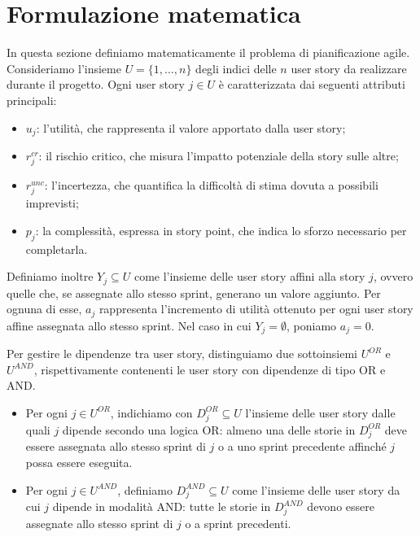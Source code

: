 \documentclass[12pt,a4paper,openright,twoside]{book}
\begin{document}
\chapter{Formulazione matematica}

In questa sezione definiamo matematicamente il problema di pianificazione agile. Consideriamo l'insieme \( U = \{1, \ldots, n\} \) degli indici delle \( n \) user story da realizzare durante il progetto. Ogni user story \( j \in U \) è caratterizzata dai seguenti attributi principali:
\begin{itemize}
    \item \( u_j \): l'utilità, che rappresenta il valore apportato dalla user story;
    \item \( r^{cr}_j \): il rischio critico, che misura l'impatto potenziale della story sulle altre;
    \item \( r^{unc}_j \): l'incertezza, che quantifica la difficoltà di stima dovuta a possibili imprevisti;
    \item \( p_j \): la complessità, espressa in story point, che indica lo sforzo necessario per completarla.
\end{itemize}

Definiamo inoltre \( Y_j \subseteq U \) come l'insieme delle user story affini alla story \( j \), ovvero quelle che, se assegnate allo stesso sprint, generano un valore aggiunto. Per ognuna di esse, \( a_j \) rappresenta l'incremento di utilità ottenuto per ogni user story affine assegnata allo stesso sprint. Nel caso in cui \( Y_j = \emptyset \), poniamo \( a_j = 0 \).

Per gestire le dipendenze tra user story, distinguiamo due sottoinsiemi \( U^{OR} \) e \( U^{AND} \), rispettivamente contenenti le user story con dipendenze di tipo OR e AND.
\begin{itemize}
    \item Per ogni \( j \in U^{OR} \), indichiamo con \( D^{OR}_j \subseteq U \) l'insieme delle user story dalle quali \( j \) dipende secondo una logica OR: almeno una delle storie in \( D^{OR}_j \) deve essere assegnata allo stesso sprint di \( j \) o a uno sprint precedente affinché \( j \) possa essere eseguita.
    \item Per ogni \( j \in U^{AND} \), definiamo \( D^{AND}_j \subseteq U \) come l'insieme delle user story da cui \( j \) dipende in modalità AND: tutte le storie in \( D^{AND}_j \) devono essere assegnate allo stesso sprint di \( j \) o a sprint precedenti.
\end{itemize}
\end{document}
